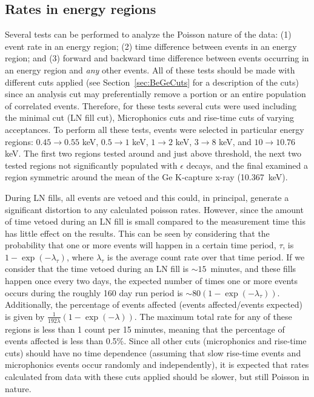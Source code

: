 		\subsection{Rates in energy regions}
		\label{sec:BeGeRate}	
		
		Several tests can be performed to analyze the Poisson nature of the data: (1) event rate in an energy region; (2) time difference between events in an energy region; and (3) forward and backward time difference between events occurring in an energy region and \emph{any} other events.  All of these tests should be made with different cuts applied (see Section~\ref{sec:BeGeCuts} for a description of the cuts) since an analysis cut may preferentially remove a portion or an entire population of correlated events.  Therefore, for these tests several cuts were used including the minimal cut (LN fill cut), Microphonics cuts and rise-time cuts of varying acceptances.  To perform all these tests, events were selected in particular energy regions: $0.45\to0.55$ keV, $0.5\to1$ keV, $1\to2$ keV, $3\to8$ keV, and $10\to10.76$ keV.  The first two regions tested around and just above threshold, the next two tested regions not significantly populated with $\epsilon$ decays, and the final examined a region symmetric around the mean of the Ge K-capture x-ray (10.367~keV).
		
	During LN fills, all events are vetoed and this could, in principal, generate a significant distortion to any calculated poisson rates.  However, since the amount of time vetoed during an LN fill is small compared to the measurement time this has little effect on the results.  This can be seen by considering that the probability that one or more events will happen in a certain time period, $\tau$, is $1 - \exp(-\lambda_{\tau})$, where $\lambda_{\tau}$ is the average count rate over that time period.  If we consider that the time vetoed during an LN fill is $\sim15$~minutes, and these fills happen once every two days, the expected number of times one or more events occurs during the roughly 160 day run period is $\sim80 (1 - \exp(-\lambda_{\tau}) )$.  Additionally, the percentage of events affected (events affected/events expected) is given by $\frac{1}{192 \lambda}\left(1 - \exp(-\lambda)\right)$.  The maximum total rate for any of these regions is less than 1 count per 15 minutes, meaning that the percentage of events affected is less than 0.5\%.  Since all other cuts (microphonics and rise-time cuts) should have no time dependence (assuming that slow rise-time events and microphonics events occur randomly and independently), it is expected that rates calculated from data with these cuts applied should be slower, but still Poisson in nature.  
	
